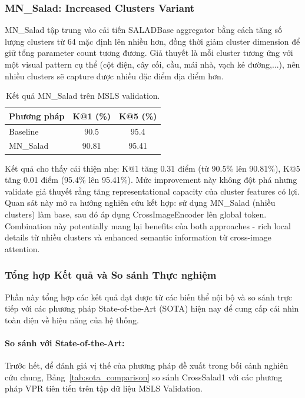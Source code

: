 \documentclass[12pt,a4paper]{article}
\begin{document}
    \subsubsection{MN\_Salad: Increased Clusters Variant}

    MN\_Salad tập trung vào cải tiến SALADBase aggregator bằng cách tăng số lượng clusters từ 64 mặc định lên nhiều hơn, đồng thời giảm cluster dimension để giữ tổng parameter count tương đương. Giả thuyết là mỗi cluster tương ứng với một visual pattern cụ thể (cột điện, cây cối, cầu, mái nhà, vạch kẻ đường,...), nên nhiều clusters sẽ capture được nhiều đặc điểm địa điểm hơn.

    \begin{table}[h]
    \centering
    \caption{Kết quả MN\_Salad trên MSLS validation.}
    \label{tab:mnsalad_results}
    \small
    \begin{tabular}{@{}lcc@{}}
    \toprule
    \textbf{Phương pháp} & \textbf{K@1 (\%)} & \textbf{K@5 (\%)} \\
    \midrule
    Baseline & 90.5 & 95.4 \\
    MN\_Salad & 90.81 & 95.41 \\
    \bottomrule
    \end{tabular}
    \end{table}

    Kết quả cho thấy cải thiện nhẹ: K@1 tăng 0.31 điểm (từ 90.5\% lên 90.81\%), K@5 tăng 0.01 điểm (95.4\% lên 95.41\%). Mức improvement này không đột phá nhưng validate giả thuyết rằng tăng representational capacity của cluster features có lợi. Quan sát này mở ra hướng nghiên cứu kết hợp: sử dụng MN\_Salad (nhiều clusters) làm base, sau đó áp dụng CrossImageEncoder lên global token. Combination này potentially mang lại benefits của both approaches - rich local details từ nhiều clusters và enhanced semantic information từ cross-image attention.

    \subsubsection{Tổng hợp Kết quả và So sánh Thực nghiệm}

    Phần này tổng hợp các kết quả đạt được từ các biến thể nội bộ và so sánh trực tiếp với các phương pháp State-of-the-Art (SOTA) hiện nay để cung cấp cái nhìn toàn diện về hiệu năng của hệ thống.

    \paragraph{So sánh với State-of-the-Art:}
    Trước hết, để đánh giá vị thế của phương pháp đề xuất trong bối cảnh nghiên cứu chung, Bảng~\ref{tab:sota_comparison} so sánh CrossSalad1 với các phương pháp VPR tiên tiến trên tập dữ liệu MSLS Validation.
\end{document}
